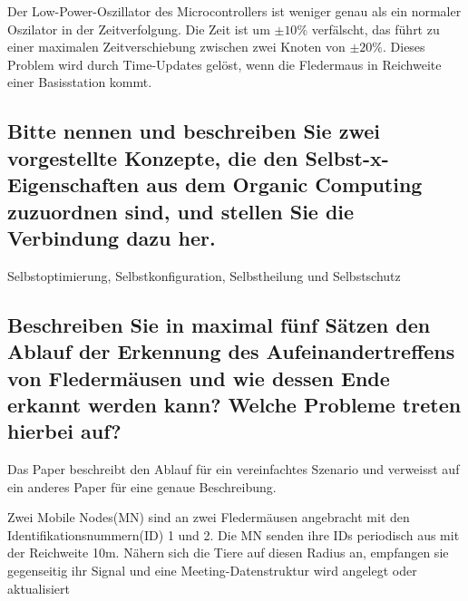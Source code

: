 \documentclass[11pt]{scrartcl}
\begin{document}
Der Low-Power-Oszillator des Microcontrollers ist weniger genau als ein normaler Oszilator in der Zeitverfolgung. Die Zeit ist um $\pm10\%$ verfälscht, das führt zu einer maximalen Zeitverschiebung zwischen zwei Knoten von $\pm20\%$. Dieses Problem wird durch Time-Updates gelöst, wenn die Fledermaus in Reichweite einer Basisstation kommt.

\subsection{Bitte nennen und beschreiben Sie zwei vorgestellte Konzepte, die den Selbst-x-Eigenschaften
aus dem Organic Computing zuzuordnen sind, und stellen Sie die Verbindung dazu her.}
Selbstoptimierung, Selbstkonfiguration, Selbstheilung und Selbstschutz
\subsection{Beschreiben Sie in maximal fünf Sätzen den Ablauf der Erkennung des Aufeinandertreffens
von Fledermäusen und wie dessen Ende erkannt werden kann? Welche Probleme treten hierbei
auf?}
Das Paper beschreibt den Ablauf für ein vereinfachtes Szenario und verweisst auf ein anderes Paper für eine genaue Beschreibung.

Zwei Mobile Nodes(MN) sind an zwei Fledermäusen angebracht mit den Identifikationsnummern(ID) 1 und 2. Die MN senden ihre IDs periodisch aus mit der Reichweite 10m. Nähern sich die Tiere auf diesen Radius an, empfangen sie gegenseitig ihr Signal und eine Meeting-Datenstruktur wird angelegt oder aktualisiert
\end{document}
